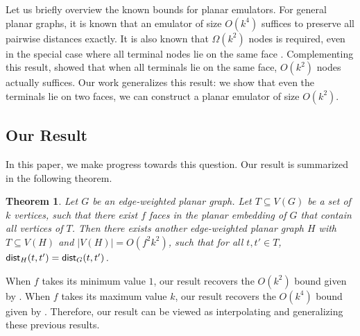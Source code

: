 \documentclass[11pt]{article}
\newtheorem{theorem}{Theorem}
\newcommand{\dist}{\textnormal{\textsf{dist}}}
\begin{document}
Let us briefly overview the known bounds for planar emulators. For general planar graphs, it is known that an emulator of size $O(k^4)$ suffices to preserve all pairwise distances exactly. It is also known that $\Omega(k^2)$ nodes is required, even in the special case where all terminal nodes lie on the same face \cite{ChangO20}. Complementing this result, \citet{ChangO20} showed that when all terminals lie on the same face, $O(k^2)$ nodes actually suffices. Our work generalizes this result: we show that even the terminals lie on two faces, we can construct a planar emulator of size $O(k^2)$. 
\fi







\subsection{Our Result}

In this paper, we make progress towards this question. Our result is summarized in the following theorem.

\begin{theorem}
\label{thm: main}
Let $G$ be an edge-weighted planar graph. Let $T\subseteq V(G)$ be a set of $k$ vertices, such that there exist $f$ faces in the planar embedding of $G$ that contain all vertices of $T$. Then there exists another edge-weighted planar graph $H$ with $T\subseteq V(H)$ and $|V(H)|=O(f^2k^2)$, such that for all  $t,t'\in T$, $\dist_H(t,t')=\dist_G(t,t')$.
\end{theorem}

When $f$ takes its minimum value $1$, our result recovers the $O(k^2)$ bound given by \cite{ChangO20,goranci2020improved}.
When $f$ takes its maximum value $k$, our result recovers the $O(k^4)$ bound given by \cite{krauthgamer2014preserving}.
Therefore, our result can be viewed as interpolating and generalizing these previous results.
\end{document}
